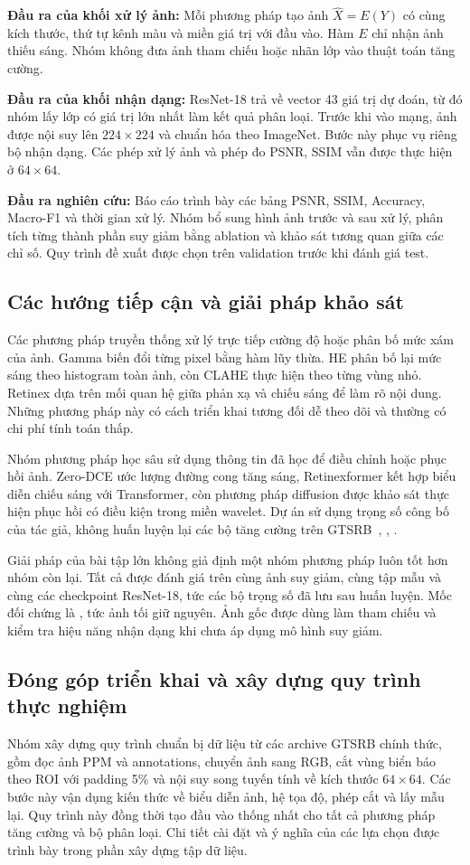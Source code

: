 \textbf{Đầu ra của khối xử lý ảnh:} Mỗi phương pháp tạo ảnh $\widehat{X}=E(Y)$ có cùng kích thước, thứ tự kênh màu và miền giá trị với đầu vào. Hàm $E$ chỉ nhận ảnh thiếu sáng. Nhóm không đưa ảnh tham chiếu hoặc nhãn lớp vào thuật toán tăng cường.

\textbf{Đầu ra của khối nhận dạng:} ResNet-18 trả về vector 43 giá trị dự đoán, từ đó nhóm lấy lớp có giá trị lớn nhất làm kết quả phân loại. Trước khi vào mạng, ảnh được nội suy lên $224\times224$ và chuẩn hóa theo ImageNet. Bước này phục vụ riêng bộ nhận dạng. Các phép xử lý ảnh và phép đo PSNR, SSIM vẫn được thực hiện ở $64\times64$.

\textbf{Đầu ra nghiên cứu:} Báo cáo trình bày các bảng PSNR, SSIM, Accuracy, Macro-F1 và thời gian xử lý. Nhóm bổ sung hình ảnh trước và sau xử lý, phân tích từng thành phần suy giảm bằng ablation và khảo sát tương quan giữa các chỉ số. Quy trình đề xuất được chọn trên validation trước khi đánh giá test.

\subsection{Các hướng tiếp cận và giải pháp khảo sát}
Các phương pháp truyền thống xử lý trực tiếp cường độ hoặc phân bố mức xám của ảnh. Gamma biến đổi từng pixel bằng hàm lũy thừa. HE phân bố lại mức sáng theo histogram toàn ảnh, còn CLAHE thực hiện theo từng vùng nhỏ. Retinex dựa trên mối quan hệ giữa phản xạ và chiếu sáng để làm rõ nội dung. Những phương pháp này có cách triển khai tương đối dễ theo dõi và thường có chi phí tính toán thấp.

Nhóm phương pháp học sâu sử dụng thông tin đã học để điều chỉnh hoặc phục hồi ảnh. Zero-DCE ước lượng đường cong tăng sáng, Retinexformer kết hợp biểu diễn chiếu sáng với Transformer, còn phương pháp diffusion được khảo sát thực hiện phục hồi có điều kiện trong miền wavelet. Dự án sử dụng trọng số công bố của tác giả, không huấn luyện lại các bộ tăng cường trên GTSRB~\cite{zerodce}, \cite{retinexformer}, \cite{diffusion}.

Giải pháp của bài tập lớn không giả định một nhóm phương pháp luôn tốt hơn nhóm còn lại. Tất cả được đánh giá trên cùng ảnh suy giảm, cùng tập mẫu và cùng các checkpoint ResNet-18, tức các bộ trọng số đã lưu sau huấn luyện. Mốc đối chứng là , tức ảnh tối giữ nguyên. Ảnh gốc  được dùng làm tham chiếu và kiểm tra hiệu năng nhận dạng khi chưa áp dụng mô hình suy giảm.

\subsection{Đóng góp triển khai và xây dựng quy trình thực nghiệm}
\label{sec:contributions}
Nhóm xây dựng quy trình chuẩn bị dữ liệu từ các archive GTSRB chính thức, gồm đọc ảnh PPM và annotations, chuyển ảnh sang RGB, cắt vùng biển báo theo ROI với padding 5\% và nội suy song tuyến tính về kích thước $64\times64$. Các bước này vận dụng kiến thức về biểu diễn ảnh, hệ tọa độ, phép cắt và lấy mẫu lại. Quy trình này đồng thời tạo đầu vào thống nhất cho tất cả phương pháp tăng cường và bộ phân loại. Chi tiết cài đặt và ý nghĩa của các lựa chọn được trình bày trong phần xây dựng tập dữ liệu.

